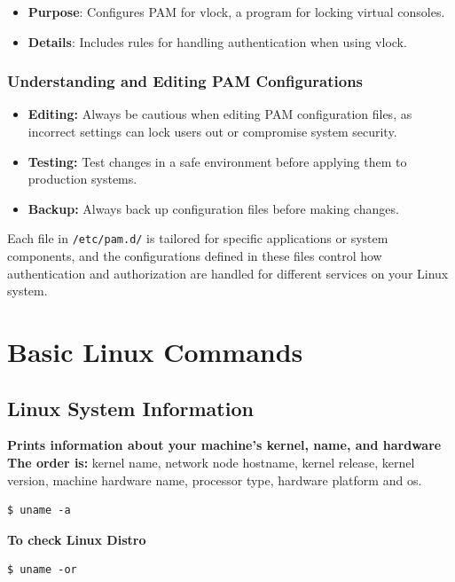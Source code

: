 \documentclass{article}
\newenvironment{codetemplate}[1][]{%
  \mybasecolorbox[#1]
  \itshape
}{%
  \endmybasecolorbox
}
\begin{document}
\begin{itemize}
    \item \textbf{Purpose}: Configures PAM for vlock, a program for locking virtual consoles.
    \item \textbf{Details}: Includes rules for handling authentication when using vlock.
\end{itemize}


\subsubsection{Understanding and Editing PAM Configurations}
\begin{itemize}
    \item \textbf{Editing:} Always be cautious when editing PAM configuration files, as incorrect settings can lock users out or compromise system security.
    \item \textbf{Testing:} Test changes in a safe environment before applying them to production systems.
    \item \textbf{Backup:} Always back up configuration files before making changes.
\end{itemize}
Each file in \verb|/etc/pam.d/| is tailored for specific applications or system components, and the configurations defined in these files control how authentication and authorization are handled for different services on your Linux system.

\newpage
\section{Basic Linux Commands}

\subsection{Linux System Information}
\textbf{Prints information about your machine’s kernel, name, and hardware}
\\ \textbf{The order is: }kernel name, network node hostname, kernel release, kernel version, machine hardware name, processor type, hardware platform and os.
\begin{codetemplate}{}
\begin{verbatim}
$ uname -a
\end{verbatim}
\end{codetemplate}

\textbf{To check Linux Distro}
\begin{codetemplate}{}
\begin{verbatim}
$ uname -or
\end{verbatim}
\end{codetemplate}
\end{document}

